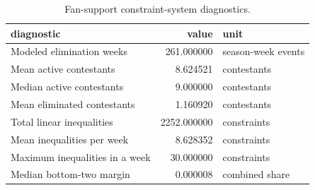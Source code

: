 \begin{table}
\caption{Fan-support constraint-system diagnostics.}
\begin{tabular}{lrl}
\toprule
diagnostic & value & unit \\
\midrule
Modeled elimination weeks & 261.000000 & season-week events \\
Mean active contestants & 8.624521 & contestants \\
Median active contestants & 9.000000 & contestants \\
Mean eliminated contestants & 1.160920 & contestants \\
Total linear inequalities & 2252.000000 & constraints \\
Mean inequalities per week & 8.628352 & constraints \\
Maximum inequalities in a week & 30.000000 & constraints \\
Median bottom-two margin & 0.000008 & combined share \\
\bottomrule
\end{tabular}
\end{table}
